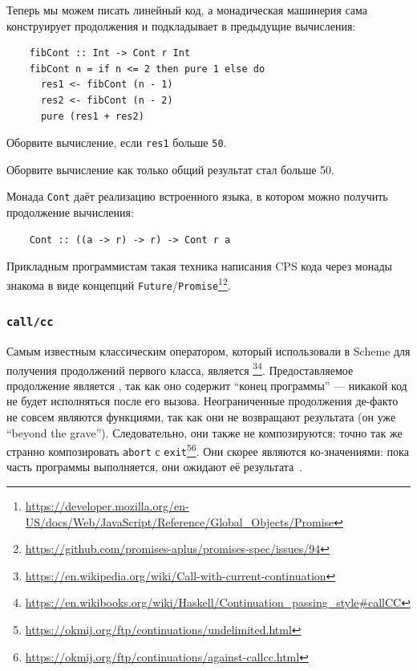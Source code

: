 
Теперь мы можем писать линейный код, а монадическая машинерия сама конструирует продолжения и подкладывает в предыдущие вычисления:
\begin{verbatim}
    fibCont :: Int -> Cont r Int
    fibCont n = if n <= 2 then pure 1 else do
      res1 <- fibCont (n - 1)
      res2 <- fibCont (n - 2)
      pure (res1 + res2)
\end{verbatim}

\begin{task}
    Оборвите вычисление, если \texttt{res1} больше \texttt{50}.
\end{task}

\begin{task}
    Оборвите вычисление как только общий результат стал больше 50.
\end{task}

Монада \texttt{Cont} даёт реализацию встроенного языка, в котором можно получить продолжение вычисления:
\begin{verbatim}
    Cont :: ((a -> r) -> r) -> Cont r a
\end{verbatim}

Прикладным программистам такая техника написания CPS кода через монады знакома в виде концепций \texttt{Future}/\texttt{Promise}\footnote{\url{https://developer.mozilla.org/en-US/docs/Web/JavaScript/Reference/Global_Objects/Promise}}\footnote{\url{https://github.com/promises-aplus/promises-spec/issues/94}}. %

\subsubsection{\texttt{call/cc}}

Самым известным классическим оператором, который использовали в Scheme для получения продолжений первого класса, является \footnote{\url{https://en.wikipedia.org/wiki/Call-with-current-continuation}}\footnote{\url{https://en.wikibooks.org/wiki/Haskell/Continuation_passing_style\#callCC}}.
Предоставляемое продолжение является , так как оно содержит ``конец программы'' --- никакой код не будет исполняться после его вызова.
Неограниченные продолжения де-факто не совсем являются функциями, так как они не возвращают результата (он уже ``beyond the grave''). Следовательно, они также не композируются; точно так же странно композировать \texttt{abort} с \texttt{exit}\footnote{\url{https://okmij.org/ftp/continuations/undelimited.html}}\footnote{\url{https://okmij.org/ftp/continuations/against-callcc.html}}.
Они скорее являются ко-значениями: пока часть программы выполняется, они ожидают её результата~\cite{curien2000duality}.

